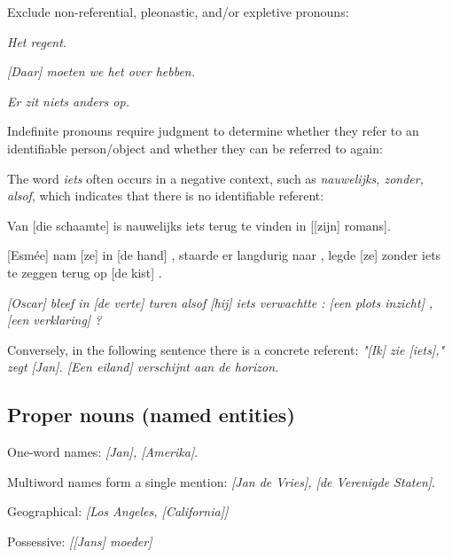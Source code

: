Exclude non-referential, pleonastic, and/or expletive pronouns:
\begin{itemize*}
   \item \emph{\n{[}Het\n{]} regent.}
   \item \emph{[Daar] moeten we \n{[}het\n{]} over hebben.}
   \item \emph{\n{[}Er\n{]} zit \n{[}niets anders\n{]} op.}
\end{itemize*}

Indefinite pronouns require judgment to determine
whether they refer to an identifiable person/object
and whether they can be referred to again:
\begin{itemize*}
    \item The word \emph{iets} often occurs in a negative context,
        such as \emph{nauwelijks, zonder, alsof}, which indicates
        that there is no identifiable referent:
        \begin{itemize*}
            \item Van [die schaamte] is nauwelijks \n{[}iets\n{]} terug te vinden in [[zijn] romans].
            \item {[}Esmée{]} nam [ze] in [de hand] , staarde er langdurig naar , legde [ze] zonder \n{[}iets\n{]} te zeggen terug op [de kist] .
            \item \emph{[Oscar] bleef in [de verte] turen alsof [hij] \n{[}iets\n{]} verwachtte : [een plots inzicht] , [een verklaring] ?}
        \end{itemize*}
    \item Conversely, in the following sentence there is a concrete referent: \emph{"[Ik] zie [iets]," zegt [Jan]. [Een eiland] verschijnt aan de horizon.}
\end{itemize*}


\subsection{Proper nouns (named entities)}
\begin{itemize*}
    \item One-word names: \emph{[Jan], [Amerika]}.
    \item Multiword names form a single mention: \emph{[Jan de Vries], [de Verenigde Staten]}.
    \item Geographical: \emph{{[}Los Angeles, [California]{]}}
    \item Possessive: \emph{[[Jans] moeder]}
\end{itemize*}



